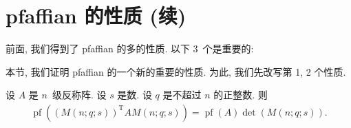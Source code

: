 \documentclass[../libro.tex]{subfiles}
\begin{document}
\section{pfaffian 的性质 (续)}

前面, 我们得到了 pfaffian 的多的性质.
以下 \(3\)~个是重要的:

\TheoremPfaffianMultiply*

\TheoremPfaffianMultipljad*

\TheoremPfaffianSquaredIsDet*

本节, 我们证明 pfaffian 的一个新的重要的性质.
为此, 我们先改写第 1, 2 个性质.

\begin{theorem}
    设 \(A\) 是 \(n\)~级反称阵.
    设 \(s\) 是数.
    设 \(q\) 是不超过 \(n\) 的正整数.
    则
    \begin{align*}
        \operatorname{pf}{( (M(n; q; s))^{\mathrm{T}}
        A M(n; q; s) )}
        = \operatorname{pf} {(A)} \det {(M(n; q; s))}.
    \end{align*}
\end{theorem}
\end{document}

